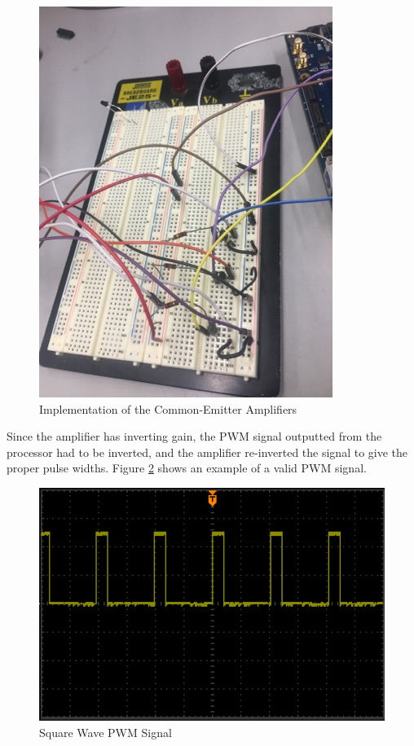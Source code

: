 \documentclass{article}
\begin{document}
        \begin{figure}[H]
            \centering
            \includegraphics[scale=0.6]{amp.jpg}
            \caption{Implementation of the Common-Emitter Amplifiers}
            \label{fig:actualAmplifier}
        \end{figure}
        
        Since the amplifier has inverting gain, the PWM signal outputted from the processor had to be inverted, and the amplifier re-inverted the signal to give the proper pulse widths. Figure \ref{fig:pwm} shows an example of a valid PWM signal.
        
        \begin{figure}[H]
            \begin{center}
                \includegraphics[scale=0.5]{pwm.PNG}
                \caption{Square Wave PWM Signal}
                \label{fig:pwm}
            \end{center}
        \end{figure}
        
\end{document}
